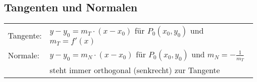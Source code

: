 

\subsection{Tangenten und Normalen}
\begin{table}[H]
  \begin{tabular}{ll}
    Tangente: &$y - y_0 = m_T \cdot (x - x_0)$ für $P_0(x_0, y_0)$
    und $m_T = f'(x)$ \\
    Normale:  &$y - y_0 = m_N \cdot (x - x_0)$ für $P_0(x_0, y_0)$
    und $m_N = -\frac{1}{m_T}$ \\
    & steht immer orthogonal (senkrecht) zur Tangente
  \end{tabular}
\end{table}

